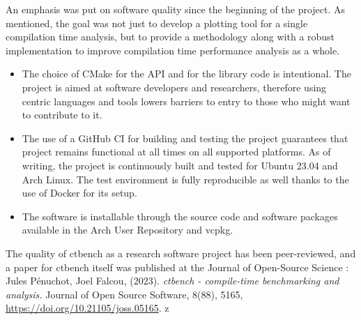 \documentclass[../main]{subfiles}
\begin{document}
An emphasis was put on software quality since the beginning of the project.
As mentioned, the goal was not just to develop a plotting tool for a single
compilation time analysis, but to provide a methodology along with a robust
implementation to improve compilation time performance analysis as a whole.

\begin{itemize}

\item
The choice of CMake for the API and \cpp for the library code is intentional.
The project is aimed at \cpp software developers and researchers, therefore
using \cpp centric languages and tools lowers barriers to entry to those
who might want to contribute to it.

\item
The use of a GitHub CI for building and testing the project guarantees that
project remains functional at all times on all supported platforms.
As of writing, the project is continuously built and tested for Ubuntu 23.04
and Arch Linux. The test environment is fully reproducible as well thanks to
the use of Docker for its setup.

\item
The software is installable through the source code and software packages
available in the Arch User Repository and vcpkg.
\end{itemize}

The quality of ctbench as a research software project has been peer-reviewed,
and a paper for ctbench itself was published at the
Journal of Open-Source Science \cite{Penuchot2023}:
Jules P\'enuchot, Joel Falcou, (2023).
\textit{ctbench - compile-time benchmarking and analysis.}
Journal of Open Source Software, 8(88), 5165,
\url{https://doi.org/10.21105/joss.05165}.
z
\end{document}
